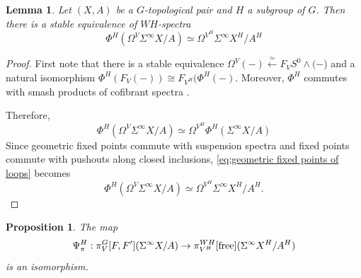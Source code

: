 \documentclass[11pt]{amsart}
\newcommand{\free}{\textup{free}}
\theoremstyle{plain}   %
\newtheorem{lem}[thm]{Lemma}
\newtheorem{prop}[thm]{Proposition}
\theoremstyle{definition}
\theoremstyle{remark}
\numberwithin{equation}{section}
\begin{document}
\begin{lem}\label{lem:geometric fixed points of loops}
Let $(X,A)$ be a $G$-topological pair and $H$ a subgroup of $G$. Then there is a stable equivalence of $WH$-spectra
\[
\Phi^H(\Omega^V\Sigma^\infty X/A)\simeq \Omega^{V^H}\Sigma^\infty X^H/A^H
\]
\end{lem}
\begin{proof}
First note that there is a stable equivalence $\Omega^V(-) \xleftarrow{\simeq} F_VS^0\wedge(-$) and a natural isomorphism $\Phi^H(F_V (-))\cong F_{V^H}(\Phi^H(-)$. Moreover, $\Phi^H$ commutes with smash products of cofibrant spectra \cite{mandell2002equivariant}.

Therefore, 
\begin{equation}\label{eq:geometric fixed points of loops}
\Phi^H(\Omega^V\Sigma^\infty X/A) \simeq \Omega^{V^H}\Phi^H(\Sigma^\infty X/A)
\end{equation}
Since geometric fixed points commute with suspension spectra and fixed points commute with pushouts along closed inclusions, \cref{eq:geometric fixed points of loops} becomes
\[
\Phi^H(\Omega^V\Sigma^\infty X/A)\simeq \Omega^{V^H}\Sigma^\infty X^H/A^H.
\]
\end{proof}

\begin{prop}\label{prop:psi pi isomorphism}
The map 
\[
\Psi_\pi^H :\pi_V^G[F,F'](\Sigma^\infty X/A) \rightarrow \pi_{V^H}^{WH}[\free](\Sigma^\infty X^H/A^H)
\]
is an isomorphism.
\end{prop}
\end{document}

